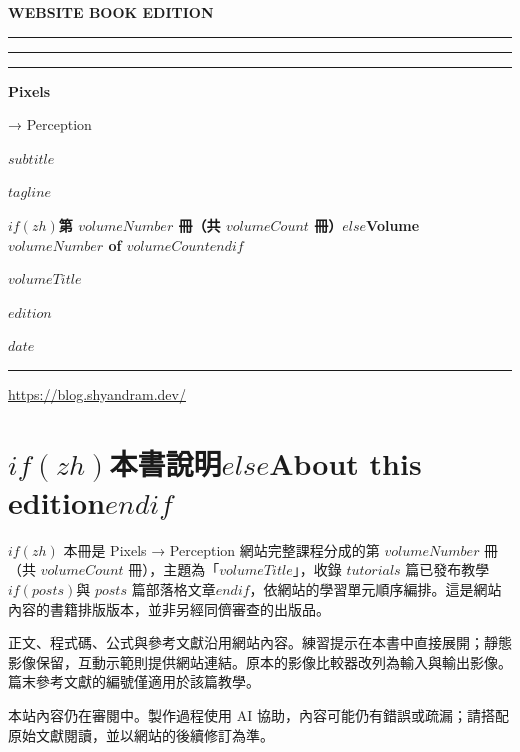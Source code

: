 \documentclass[11pt,oneside,openany]{book}
\begin{document}
\hypersetup{pageanchor=false}
\begin{titlepage}
\color{ink}
\vspace*{8mm}
{\sffamily\small\bfseries WEBSITE BOOK EDITION\par}
\vspace{16mm}
{\color{accent}\rule{22mm}{4mm}\hspace{2mm}\rule{8mm}{4mm}\hspace{2mm}\rule{4mm}{4mm}\par}
\vspace{10mm}
{\fontsize{38}{43}\selectfont\bfseries Pixels\par → Perception\par}
\vspace{12mm}
{\sffamily\Large $subtitle$\par}
\vspace{5mm}
{\sffamily $tagline$\par}
\vspace{14mm}
{\sffamily\bfseries\Large $if(zh)$第 $volumeNumber$ 冊（共 $volumeCount$ 冊）$else$Volume $volumeNumber$ of $volumeCount$$endif$\par}
\vspace{2mm}
{\sffamily\large\color{accent} $volumeTitle$\par}
\vfill
{\sffamily\large $edition$\par}
\vspace{3mm}
{\sffamily $date$\par}
\vspace{8mm}
\rule{\linewidth}{0.5pt}
{\small\sffamily\url{https://blog.shyandram.dev/}\par}
\end{titlepage}
\frontmatter
\hypersetup{pageanchor=true}
\chapter*{$if(zh)$本書說明$else$About this edition$endif$}
$if(zh)$
本冊是 Pixels → Perception 網站完整課程分成的第 $volumeNumber$ 冊（共 $volumeCount$ 冊），主題為「$volumeTitle$」，收錄 $tutorials$ 篇已發布教學$if(posts)$與 $posts$ 篇部落格文章$endif$，依網站的學習單元順序編排。這是網站內容的書籍排版版本，並非另經同儕審查的出版品。

正文、程式碼、公式與參考文獻沿用網站內容。練習提示在本書中直接展開；靜態影像保留，互動示範則提供網站連結。原本的影像比較器改列為輸入與輸出影像。篇末參考文獻的編號僅適用於該篇教學。

本站內容仍在審閱中。製作過程使用 AI 協助，內容可能仍有錯誤或疏漏；請搭配原始文獻閱讀，並以網站的後續修訂為準。
\end{document}
